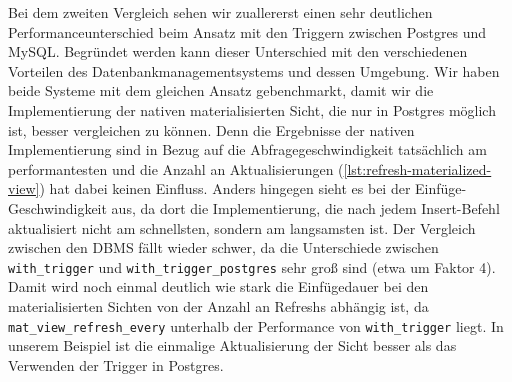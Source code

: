 Bei dem zweiten Vergleich sehen wir zuallererst einen sehr deutlichen Performanceunterschied beim Ansatz mit den Triggern zwischen Postgres und MySQL\@.
Begründet werden kann dieser Unterschied mit den verschiedenen Vorteilen des Datenbankmanagementsystems und dessen Umgebung.
Wir haben beide Systeme mit dem gleichen Ansatz gebenchmarkt, damit wir die Implementierung der nativen materialisierten Sicht, die nur in Postgres möglich ist, besser vergleichen zu können.
Denn die Ergebnisse der nativen Implementierung sind in Bezug auf die Abfragegeschwindigkeit tatsächlich am performantesten und die Anzahl an Aktualisierungen (\ref{lst:refresh-materialized-view}) hat dabei keinen Einfluss.
Anders hingegen sieht es bei der Einfüge-Geschwindigkeit aus, da dort die Implementierung, die nach jedem Insert-Befehl aktualisiert nicht am schnellsten, sondern am langsamsten ist.
Der Vergleich zwischen den DBMS fällt wieder schwer, da die Unterschiede zwischen \texttt{with\_trigger} und \texttt{with\_trigger\_postgres} sehr groß sind (etwa um Faktor 4).
Damit wird noch einmal deutlich wie stark die Einfügedauer bei den materialisierten Sichten von der Anzahl an Refreshs abhängig ist, da \texttt{mat\_view\_refresh\_every} unterhalb der Performance von \texttt{with\_trigger} liegt.
In unserem Beispiel ist die einmalige Aktualisierung der Sicht besser als das Verwenden der Trigger in Postgres.

